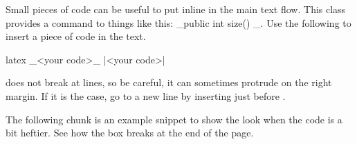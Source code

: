 \documentclass[raggedright, twoside, 11pt]{tufte-style-article}
\begin{document}
Small pieces of code can be useful to put inline in the main text flow. This class provides a command to things like this: _public int size() {}_. Use the following to insert a piece of code in the text.


\begin{codebox}{latex}
_<your code>_ %
|<your code>|
\end{codebox}

 does not break at lines, so be careful, it can sometimes protrude on the right margin. If it is the case, go to a new line by inserting  just before .


The following chunk is an example snippet to show the look when the code is a bit heftier. See how the box breaks at the end of the page.
\end{document}
